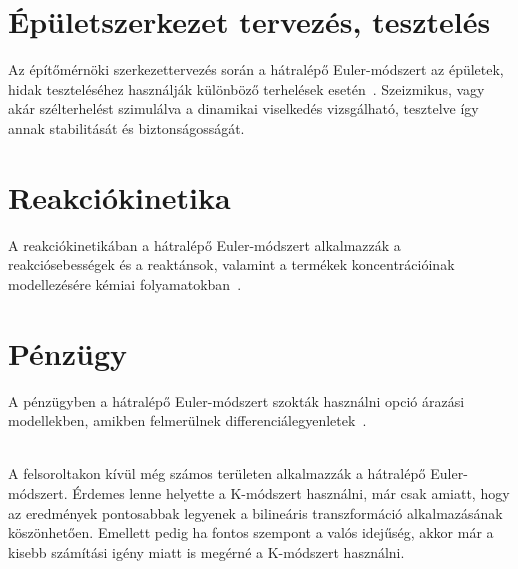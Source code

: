 \section{Épületszerkezet tervezés, tesztelés}
Az építőmérnöki szerkezettervezés során a hátralépő Euler-módszert az épületek, hidak teszteléséhez használják különböző terhelések esetén~\cite{structeng}. Szeizmikus, vagy akár szélterhelést szimulálva a dinamikai viselkedés vizsgálható, tesztelve így annak stabilitását és biztonságosságát.

\section{Reakciókinetika}
A reakciókinetikában a hátralépő Euler-módszert alkalmazzák a reakciósebességek és a reaktánsok, valamint a termékek koncentrációinak modellezésére kémiai folyamatokban~\cite{chemeng}.

\section{Pénzügy}
A pénzügyben a hátralépő Euler-módszert szokták használni opció árazási modellekben, amikben felmerülnek differenciálegyenletek~\cite{finance}.

\\

A felsoroltakon kívül még számos területen alkalmazzák a hátralépő Euler-módszert. Érdemes lenne helyette a K-módszert használni, már csak amiatt, hogy az eredmények pontosabbak legyenek a bilineáris transzformáció alkalmazásának köszönhetően. Emellett pedig ha fontos szempont a valós idejűség, akkor már a kisebb számítási igény miatt is megérné a K-módszert használni.   